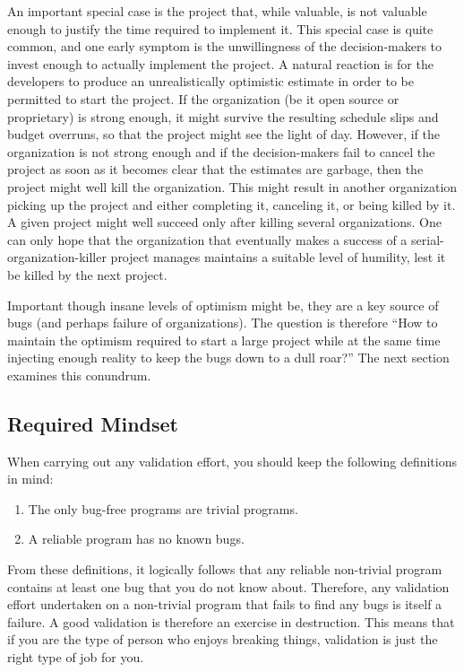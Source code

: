 An important special case is the project that, while valuable, is not
valuable enough to justify the time required to implement it.
This special case is quite common, and one early symptom is the
unwillingness of the decision-makers to invest enough to actually
implement the project.
A natural reaction is for the developers to produce an unrealistically
optimistic estimate in order to be permitted to start the project.
If the organization (be it open source or proprietary) is strong enough,
it might survive the resulting schedule slips and budget overruns,
so that the project might see the light of day.
However, if the organization is not strong enough and if the decision-makers
fail to cancel the project as soon as it becomes clear that the estimates
are garbage, then the project might well kill the organization.
This might result in another organization picking up the project and
either completing it, canceling it, or being killed by it.
A given project might well succeed only after killing several
organizations.
One can only hope that the organization that eventually makes a success
of a serial-organization-killer project manages maintains a suitable
level of humility, lest it be killed by the next project.

Important though insane levels of optimism might be, they are a key source
of bugs (and perhaps failure of organizations).
The question is therefore ``How to maintain the optimism required to start
a large project while at the same time injecting enough reality to keep
the bugs down to a dull roar?''
The next section examines this conundrum.

\subsection{Required Mindset}
\label{sec:debugging:Required Mindset}

When carrying out any validation effort, you should keep the following
definitions in mind:

\begin{enumerate}
\item	The only bug-free programs are trivial programs.
\item	A reliable program has no known bugs.
\end{enumerate}

From these definitions, it logically follows that any reliable
non-trivial program contains at least one bug that you do not
know about.
Therefore, any validation effort undertaken on a non-trivial program
that fails to find any bugs is itself a failure.
A good validation is therefore an exercise in destruction.
This means that if you are the type of person who enjoys breaking things,
validation is just the right type of job for you.

